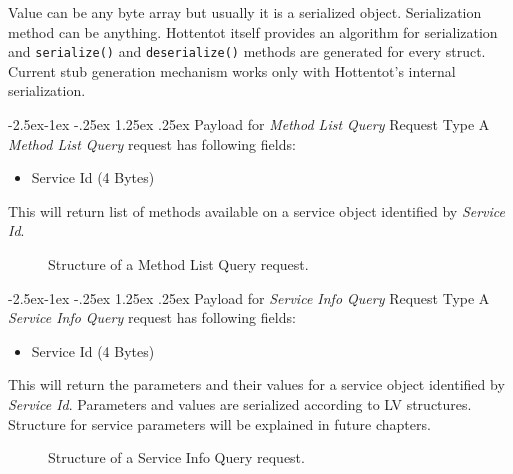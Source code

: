 \documentclass[10pt,a4paper]{article}
\makeatletter
\renewcommand\paragraph{\@startsection{paragraph}{4}{\z@}%
            {-2.5ex\@plus -1ex \@minus -.25ex}%
            {1.25ex \@plus .25ex}%
            {\normalfont\normalsize\bfseries}}
\makeatother
\begin{document}
Value can be any byte array but usually it is a serialized object. Serialization method can be anything. Hottentot itself provides an algorithm for serialization and \texttt {serialize()} and \texttt {deserialize()} methods are generated for every struct. Current stub generation mechanism works only with Hottentot's internal serialization.

\paragraph{Payload for \textit{Method List Query} Request Type} 
A \textit{Method List Query} request has following fields:
\begin{itemize}
  \item Service Id (4 Bytes)
\end{itemize}
This will return list of methods available on a service object identified by \textit{Service Id}.

\begin{figure}[!ht]
  \caption{Structure of a Method List Query request.}
  \centering
\end{figure}

\paragraph{Payload for \textit{Service Info Query} Request Type} 
A \textit{Service Info Query} request has following fields:
\begin{itemize}
  \item Service Id (4 Bytes)
\end{itemize}
This will return the parameters and their values for a service object identified by \textit{Service Id}. Parameters and values are serialized according to LV structures. Structure for service parameters will be explained in future chapters.

\begin{figure}[!ht]
  \caption{Structure of a Service Info Query request.}
  \centering
\end{figure}
\end{document}
